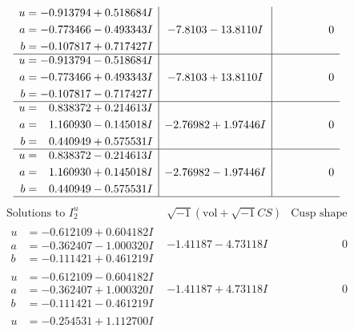 \documentclass[1p]{elsarticle_modified}
\theoremstyle{definition}
\newcommand{\I}{\sqrt{-1}}
\begin{document}
$$\begin{array}{c|c|c}
\begin{aligned}
u &= -0.913794 + 0.518684 I \\
a &= -0.773466 - 0.493343 I \\
b &= -0.107817 + 0.717427 I\end{aligned}
 & -7.8103 - 13.8110 I & \phantom{-0.000000 } 0 \\ \hline\begin{aligned}
u &= -0.913794 - 0.518684 I \\
a &= -0.773466 + 0.493343 I \\
b &= -0.107817 - 0.717427 I\end{aligned}
 & -7.8103 + 13.8110 I & \phantom{-0.000000 } 0 \\ \hline\begin{aligned}
u &= \phantom{-}0.838372 + 0.214613 I \\
a &= \phantom{-}1.160930 - 0.145018 I \\
b &= \phantom{-}0.440949 + 0.575531 I\end{aligned}
 & -2.76982 + 1.97446 I & \phantom{-0.000000 } 0 \\ \hline\begin{aligned}
u &= \phantom{-}0.838372 - 0.214613 I \\
a &= \phantom{-}1.160930 + 0.145018 I \\
b &= \phantom{-}0.440949 - 0.575531 I\end{aligned}
 & -2.76982 - 1.97446 I & \phantom{-0.000000 } 0\\
 \hline 
 \end{array}$$\newpage$$\begin{array}{c|c|c}  
\text{Solutions to }I^u_{2}& \I (\text{vol} + \sqrt{-1}CS) & \text{Cusp shape}\\
 \hline 
\begin{aligned}
u &= -0.612109 + 0.604182 I \\
a &= -0.362407 - 1.000320 I \\
b &= -0.111421 + 0.461219 I\end{aligned}
 & -1.41187 - 4.73118 I & \phantom{-0.000000 } 0 \\ \hline\begin{aligned}
u &= -0.612109 - 0.604182 I \\
a &= -0.362407 + 1.000320 I \\
b &= -0.111421 - 0.461219 I\end{aligned}
 & -1.41187 + 4.73118 I & \phantom{-0.000000 } 0 \\ \hline\begin{aligned}
u &= -0.254531 + 1.112700 I \\

\end{aligned}
\end{array}$$
\end{document}
